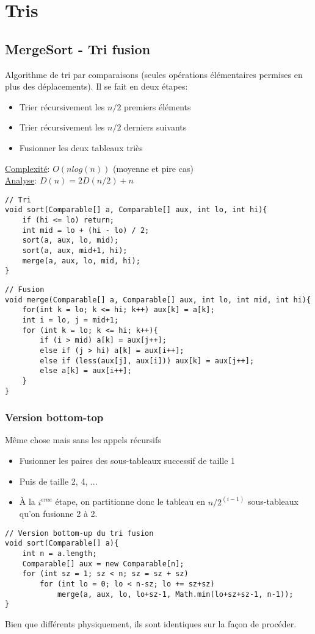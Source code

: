 \documentclass[10pt]{article}
\begin{document}
\section{Tris}
\subsection{MergeSort - Tri fusion}
Algorithme de tri par comparaisons (seules opérations élémentaires permises en plus des déplacements). Il se fait en deux étapes:
\begin{itemize}
\item Trier récursivement les $n/2$ premiers éléments
\item Trier récursivement les $n/2$ derniers suivants
\item Fusionner les deux tableaux triès 
\end{itemize}
\underline{Complexité}: $O(nlog(n))$ (moyenne et pire cas)\\
\underline{Analyse}: $D(n) = 2D(n/2) + n$
\begin{verbatim}
// Tri
void sort(Comparable[] a, Comparable[] aux, int lo, int hi){
	if (hi <= lo) return;
	int mid = lo + (hi - lo) / 2;
	sort(a, aux, lo, mid);
	sort(a, aux, mid+1, hi);
	merge(a, aux, lo, mid, hi);
} 
\end{verbatim}

\begin{verbatim}
// Fusion
void merge(Comparable[] a, Comparable[] aux, int lo, int mid, int hi){
	for(int k = lo; k <= hi; k++) aux[k] = a[k];
	int i = lo, j = mid+1;
	for (int k = lo; k <= hi; k++){
		if (i > mid) a[k] = aux[j++];
		else if (j > hi) a[k] = aux[i++];
		else if (less(aux[j], aux[i])) aux[k] = aux[j++];
		else a[k] = aux[i++];
	}
}
\end{verbatim}

\subsubsection{Version bottom-top}
Même chose mais sans les appels récursifs
\begin{itemize}
\item Fusionner les paires des sous-tableaux successif de taille 1
\item Puis de taille 2, 4, ...
\item À la $i^{eme}$ étape, on partitionne donc le tableau en $n/2^{(i-1)}$ sous-tableaux qu'on fusionne 2 à 2. 
\end{itemize}
\begin{verbatim}
// Version bottom-up du tri fusion
void sort(Comparable[] a){
	int n = a.length;
	Comparable[] aux = new Comparable[n];
	for (int sz = 1; sz < n; sz = sz + sz)
		for (int lo = 0; lo < n-sz; lo += sz+sz)
			merge(a, aux, lo, lo+sz-1, Math.min(lo+sz+sz-1, n-1));
}
\end{verbatim}
Bien que différents physiquement, ils sont identiques sur la façon de procéder.
\end{document}
